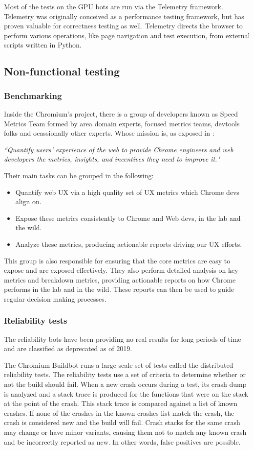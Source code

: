 Most of the tests on the GPU bots are run via the Telemetry framework. Telemetry was originally conceived as a performance testing framework, but has proven valuable for correctness testing as well. Telemetry directs the browser to perform various operations, like page navigation and test execution, from external scripts written in Python. 

\subsection{Non-functional testing}

\subsubsection{Benchmarking}
Inside the Chromium's project, there is a group of developers known as Speed Metrics Team formed by area domain experts, focused metrics teams, devtools folks and ocassionally other experts. Whose mission is, as exposed in \cite{bench}:

\textit{``Quantify users' experience of the web to provide Chrome engineers and web developers the metrics, insights, and incentives they need to improve it."}

Their main tasks can be grouped in the following:
\begin{itemize}
    \item Quantify web UX via a high quality set of UX metrics which Chrome devs align on.
    \item Expose these metrics consistently to Chrome and Web devs, in the lab and the wild.
    \item Analyze these metrics, producing actionable reports driving our UX efforts.
\end{itemize}
This group is also responsible for ensuring that the core metrics are easy to expose and are exposed effectively. They also perform detailed analysis on key metrics and breakdown metrics, providing actionable reports on how Chrome performs in the lab and in the wild. These reports can then be used to guide regular decision making processes.

\subsubsection{Reliability tests}
The reliability bots have been providing no real results for long periods of time and are classified as deprecated as of 2019. 

The Chromium Buildbot runs a large scale set of tests called the distributed reliability tests. The reliability tests use a set of criteria to determine whether or not the build should fail. When a new crash occurs during a test, its crash dump is analyzed and a stack trace is produced for the functions that were on the stack at the point of the crash.  This stack trace is compared against a list of known crashes.  If none of the crashes in the known crashes list match the crash, the crash is considered new and the build will fail. Crash stacks for the same crash may change or have minor variants, causing them not to match any known crash and be incorrectly reported as new.  In other words, false positives are possible. 


